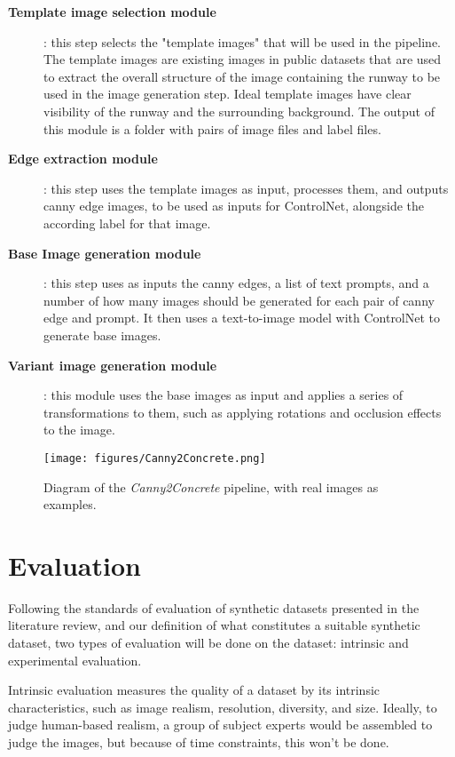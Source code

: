 \begin{description}
    \item[\textbf{Template image selection module}]: this step selects the "template images" that will be used in the pipeline. The template images are existing images in public datasets that are used to extract the overall structure of the image containing the runway to be used in the image generation step. Ideal template images have clear visibility of the runway and the surrounding background. The output of this module is a folder with pairs of image files and label files.

    \item[\textbf{Edge extraction module}]: this step uses the template images as input, processes them, and outputs canny edge images, to be used as inputs for ControlNet, alongside the according label for that image.

    \item[\textbf{Base Image generation module}]: this step uses as inputs the canny edges, a list of text prompts, and a number of how many images should be generated for each pair of canny edge and prompt. It then uses a text-to-image model with ControlNet to generate base images.

    \item[\textbf{Variant image generation module}]: this module uses the base images as input
      and applies a series of transformations to them, such as
      applying rotations and occlusion effects to the image.
\end{description}

\begin{figure}[htbp]
\centering
\texttt{[image: figures/Canny2Concrete.png]}
  \caption{Diagram of the \emph{Canny2Concrete} pipeline, with real images as
  examples.}
\end{figure}

\FloatBarrier
\section{Evaluation}

Following the standards of evaluation of synthetic datasets presented in the literature review, and our definition of what constitutes a suitable synthetic dataset, two types of evaluation will be done on the dataset: intrinsic and experimental evaluation.

Intrinsic evaluation measures the quality of a dataset by its intrinsic characteristics, such as image realism, resolution, diversity, and size. Ideally, to judge human-based realism, a group of subject experts would be assembled to judge the images, but because of time constraints, this won't be done.

